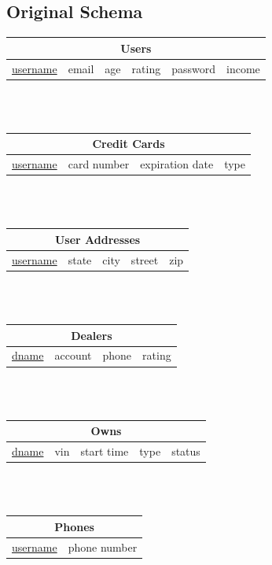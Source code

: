 \documentclass[12pt]{article}
\begin{document}
\subsection{Original Schema}
\begin{center}
\begin{tabularx}{\textwidth}{|X|X|X|X|X|X|}
\hline
\multicolumn{6}{|c|}{Users}\\\hline
\underline{username} & email & age & rating & password & income\\\hline
\end{tabularx}
~\\~\\
\begin{tabularx}{\textwidth}{|X|X|X|X|}
\hline
\multicolumn{4}{|c|}{Credit Cards}\\\hline
\underline{username} & card number & expiration date & type\\\hline
\end{tabularx}
~\\~\\
\begin{tabularx}{\textwidth}{|X|X|X|X|X|}
\hline
\multicolumn{5}{|c|}{User Addresses}\\\hline
\underline{username} & state & city & street & zip\\\hline
\end{tabularx}
~\\~\\
\begin{tabularx}{\textwidth}{|X|X|X|X|}
\hline
\multicolumn{4}{|c|}{Dealers}\\\hline
\underline{dname} & account & phone & rating\\\hline
\end{tabularx}
~\\~\\
\begin{tabularx}{\textwidth}{|X|X|X|X|X|}
\hline
\multicolumn{5}{|c|}{Owns}\\\hline
\underline{dname} & vin & start time & type & status\\\hline
\end{tabularx}
~\\~\\
\begin{tabularx}{\textwidth}{|X|X|}
\hline
\multicolumn{2}{|c|}{Phones}\\\hline
\underline{username} & phone number\\\hline
\end{tabularx}

\end{center}
\end{document}
